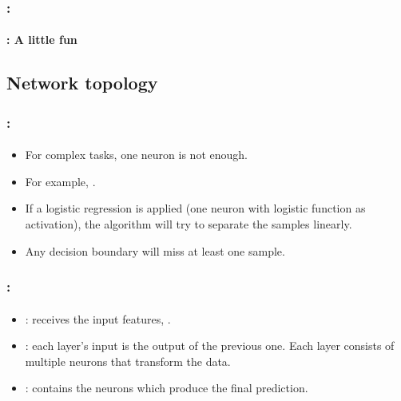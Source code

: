 \documentclass[xcolor=table]{beamer}
\begin{document}
\begin{frame}
	\frametitle{\insertshortsubtitle: \insertsection}
	\framesubtitle{\insertsubsection: A little fun}
	
	\begin{center}
	\end{center}
	
\end{frame}

\subsection{Network topology}

\begin{frame}
	\frametitle{\insertshortsubtitle: \insertsection}
	\framesubtitle{\insertsubsection}
	
	\begin{minipage}{0.59\textwidth}
		\begin{itemize}
			\item For complex tasks, one neuron is not enough.
			\item For example, .
			\item If a logistic regression is applied (one neuron with logistic function as activation), the algorithm will try to separate the samples linearly.
			\item Any decision boundary will miss at least one sample.
		\end{itemize}
	\end{minipage}
	\begin{minipage}{0.4\textwidth}
	\end{minipage}
	
\end{frame}

\begin{frame}
	\frametitle{\insertshortsubtitle: \insertsection}
	\framesubtitle{\insertsubsection}
	
	\begin{minipage}{0.59\textwidth}
		\begin{itemize}
			\item {}: receives the input features, .
			\item {}: each layer's input is the output of the previous one. 
			Each layer consists of multiple neurons that transform the data.
			\item {}: contains the neurons which produce the final prediction. 
		\end{itemize}
	\end{minipage}
	\begin{minipage}{0.4\textwidth}
	\end{minipage}
	
\end{frame}
\end{document}
